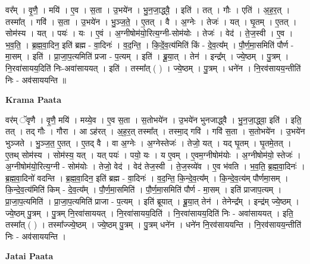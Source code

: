\documentclass[17pt]{extarticle}
\begin{document}
वर᳚म् । वृ॒णै॒ । मयि॑ । ए॒व । स॒ता । उ॒भये॑न । भु॒न॒जा॒द्ध्वै॒ । इति॑ । तत् । गौः । एति॑ । अ॒ह॒र॒त् । तस्मा᳚त् । गवि॑ । स॒ता । उ॒भये॑न । भु॒ञ्ज॒ते॒ । ए॒तत् । वै । अ॒ग्नेः । तेजः॑ । यत् । घृ॒तम् । ए॒तत् । सोम॑स्य । यत् । पयः॑ । यः । ए॒वं । अ॒ग्नीषोम॑यो॒रित्य॒ग्नी-सोम॑योः । तेजः॑ । वेद॑ । ते॒ज॒स्वी । ए॒व । भ॒व॒ति॒ । ब्र॒ह्म॒वा॒दिन॒ इति॑ ब्रह्म - वा॒दिनः॑ । व॒द॒न्ति॒ । कि॒दें॒व॒त्य॑मिति॑ किं - दे॒व॒त्य᳚म् । पौ॒र्ण॒मा॒समिति॑ पौर्ण - मा॒सम् । इति॑ । प्रा॒जा॒प॒त्यमिति॑ प्रजा - प॒त्यम् । इति॑ । ब्रू॒या॒त् । तेन॑ । इन्द्र᳚म् । ज्ये॒ष्ठम् । पु॒त्रम् । नि॒रवा॑सायय॒दिति॑ निः-अवा॑साययत् । इति॑ । तस्मा᳚त् ( ) । ज्ये॒ष्ठम् । पु॒त्रम् । धने॑न । नि॒रव॑सायय॒न्तीति॑ निः - अव॑साययन्ति ॥  \newline


\textbf{Krama Paata} \newline

वर॑म् ॅवृणै । वृ॒णै॒ मयि॑ । मय्ये॒व । ए॒व स॒ता । स॒तोभये॑न । उ॒भये॑न भुनजाद्ध्वै । भु॒न॒जा॒द्ध्वा॒ इति॑ । इति॒ तत् । तद् गौः । गौरा । आ ऽह॑रत् । अ॒ह॒र॒त् तस्मा᳚त् । तस्मा॒द् गवि॑ । गवि॑ स॒ता । स॒तोभये॑न । उ॒भये॑न भुञ्जते । भु॒ञ्ज॒त॒ ए॒तत् । ए॒तद् वै । वा अ॒ग्नेः । अ॒ग्नेस्तेजः॑ । तेजो॒ यत् । यद् घृ॒तम् । घृ॒तमे॒तत् । ए॒तथ् सोम॑स्य । सोम॑स्य॒ यत् । यत् पयः॑ । पयो॒ यः । य ए॒वम् । ए॒वम॒ग्नीषोम॑योः । अ॒ग्नीषोम॑यो॒ स्तेजः॑ । अ॒ग्नीषोम॑यो॒रित्य॒ग्नी - सोम॑योः । तेजो॒ वेद॑ । वेद॑ तेज॒स्वी । ते॒ज॒स्व्ये॑व । ए॒व भ॑वति । भ॒व॒ति॒ ब्र॒ह्म॒वा॒दिनः॑ । ब्र॒ह्म॒वा॒दिनो॑ वदन्ति । ब्र॒ह्म॒वा॒दिन॒ इति॑ ब्रह्म - वा॒दिनः॑ । व॒द॒न्ति॒ कि॒न्दे॒व॒त्य᳚म् । कि॒न्दे॒व॒त्य॑म् पौर्णमा॒सम् । कि॒न्दे॒व॒त्य॑मिति॑ किम् - दे॒व॒त्य᳚म् । पौ॒र्ण॒मा॒समिति॑ । पौ॒र्ण॒मा॒समिति॑ पौर्ण - मा॒सम् । इति॑ प्राजाप॒त्यम् । प्रा॒जा॒प॒त्यमिति॑ । प्रा॒जा॒प॒त्यमिति॑ प्राजा - प॒त्यम् । इति॑ ब्रूयात् । ब्रू॒या॒त् तेन॑ । तेनेन्द्र᳚म् । इन्द्र॑म् ज्ये॒ष्ठम् । ज्ये॒ष्ठम् पु॒त्रम् । पु॒त्रम् नि॒रवा॑साययत् । नि॒रवा॑सायय॒दिति॑ । नि॒रवा॑सायय॒दिति॑ निः - अवा॑साययत् । इति॒ तस्मा᳚त् ( ) । तस्मा᳚ज्ज्ये॒ष्ठम् । ज्ये॒ष्ठम् पु॒त्रम् । पु॒त्रम् धने॑न । धने॑न नि॒रव॑साययन्ति । नि॒रव॑सायय॒न्तीति॑ निः - अव॑साययन्ति । \newline

\textbf{Jatai Paata} \newline
\end{document}
